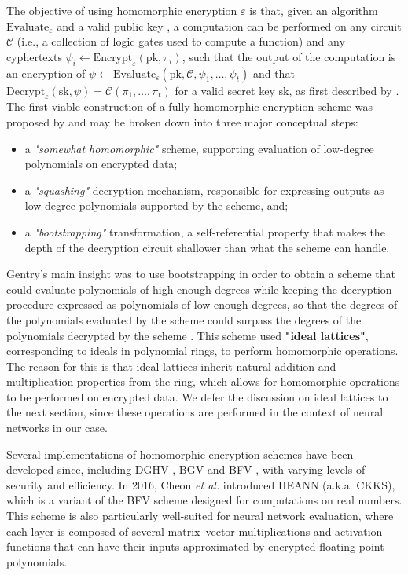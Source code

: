 \documentclass{article}
\begin{document}
The objective of using homomorphic encryption \(\varepsilon\) is that, given an algorithm \(\text{Evaluate}_\varepsilon\) and a valid public key , a computation can be performed on any circuit \(\mathcal{C}\) (i.e., a collection of logic gates used to compute a function) and any cyphertexts \(\psi_i \leftarrow \text{Encrypt}_{\varepsilon}(\text{pk}, \pi_i)\), such that the output of the computation is an encryption of $\psi \leftarrow \text{Evaluate}_{\varepsilon}(\text{pk}, \mathcal{C}, \psi_1, \dots, \psi_t)$
and that \(\text{Decrypt}_{\varepsilon}(\text{sk}, \psi) = \mathcal{C}(\pi_1, \dots, \pi_t)\) for a valid secret key \(\text{sk}\), as first described by \cite{rivest1978data}. The first viable construction of a fully homomorphic encryption scheme was proposed by \cite{gentry2009fully} and may be broken down into three major conceptual steps:

\begin{itemize}
    \item a \emph{"somewhat homomorphic"} scheme, supporting evaluation of low-degree polynomials on encrypted data;
    \item a \emph{"squashing"} decryption mechanism, responsible for expressing outputs as low-degree polynomials supported by the scheme, and;
    \item a \emph{"bootstrapping"} transformation, a self-referential property that makes the depth of the decryption circuit shallower than what the scheme can handle.
\end{itemize}

Gentry's main insight was to use bootstrapping in order to obtain a scheme that could evaluate polynomials of high-enough degrees while keeping the decryption procedure expressed as polynomials of low-enough degrees, so that the degrees of the polynomials evaluated by the scheme could surpass the degrees of the polynomials decrypted by the scheme \cite{gentry2011implementing}. This scheme used \textbf{"ideal lattices"}, corresponding to ideals in polynomial rings, to perform homomorphic operations. The reason for this is that ideal lattices inherit natural addition and multiplication properties from the ring, which allows for homomorphic operations to be performed on encrypted data. We defer the discussion on ideal lattices to the next section, since these operations are performed in the context of neural networks in our case.

Several implementations of homomorphic encryption schemes have been developed since, including DGHV \cite{van2010fully}, BGV \cite{brakerski2014leveled} and BFV \cite{fan2012somewhat}, with varying levels of security and efficiency. In 2016, Cheon \emph{et al.} introduced HEANN (a.k.a. CKKS), which is a variant of the BFV scheme designed for computations on real numbers. This scheme is also particularly well-suited for neural network evaluation, where each layer is composed of several matrix--vector multiplications and activation functions that can have their inputs approximated by encrypted floating-point polynomials.
\end{document}
